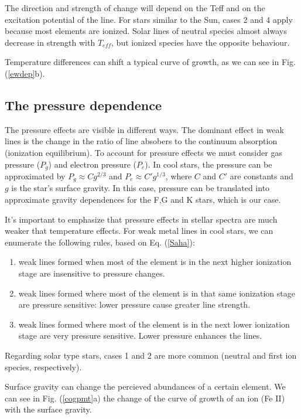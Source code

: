 \documentclass[dvips,12pt,a4paper]{report}
\begin{document}
{The direction and strength of change will depend on the Teff and on the excitation potential of the line. For stars similar to the Sun, cases 2 and 4 apply because most elements are ionized. Solar lines of neutral species almost always decrease in strength with $T_{eff}$, but ionized species have the opposite behaviour. 

Temperature differences can shift a typical curve of growth, as we can see in Fig. (\ref{ewdep}b).

\subsection{The pressure dependence}

The pressure effects are visible in different ways. The dominant effect in weak lines is the change in the ratio of line absobers to the continuum absorption (ionization equilibrium). To account for pressure effects we must consider gas pressure ($P_g$) and electron pressure ($P_e$). In cool stars, the pressure can be approximated by $P_g\approx C g^{2/3}$ and $P_e\approx C' g^{1/3}$, where $C$ and $C'$ are constants and $g$ is the star's surface gravity. In this case, pressure can be translated into approximate gravity dependences for the F,G and K stars, which is our case. %

It's important to emphasize that pressure effects in stellar spectra are much weaker that temperature effects. For weak metal lines in cool stars, we can enumerate the following rules, based on Eq. (\ref{Saha}):

\begin{enumerate}
 \item weak lines formed when most of the element is in the next higher ionization stage are insensitive to pressure changes.
\item weak lines formed where most of the element is in that same ionization stage are pressure sensitive: lower pressure cause greater line strength.
\item weak lines formed where most of the element is in the next lower ionization stage are very pressure sensitive. Lower pressure enhances the lines.
\end{enumerate}

Regarding solar type stars, cases 1 and 2 are more common (neutral and first ion species, respectively).

Surface gravity can change the percieved abundances of a certain element. We can see in Fig. (\ref{cogpmt}a) the change of the curve of growth of an ion (Fe II) with the surface gravity.

}
\end{document}
